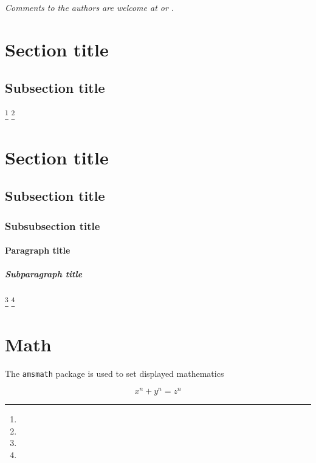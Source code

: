 \documentclass{frbaart}
\begin{document}
%
%

\textit{Comments to the authors are welcome at
  \textup{} or
  \textup{}}.


\mainmatter

\section{Section title}

\lipsum[1][1-3]

\subsection{Subsection title}
\lipsum[1]
\footnote{\lipsum[2] }
\lipsum[1][1]\footnote{\lipsum[3][1]}
\lipsum[1-3]

\section{Section title}

\subsection{Subsection title}

\lipsum[1][1-2]

\subsubsection{Subsubsection title}

\lipsum[2][1-2]

\paragraph{Paragraph title}

\lipsum[3][1-2]

\subparagraph{Subparagraph title}

\lipsum[4][1]\footnote{\lipsum[1] }
\lipsum[5][1]\footnote{\lipsum[6][1] }
\lipsum[1-3]


\section{Math}%
\label{sec:math}

The \texttt{amsmath} package is used to set displayed mathematics

\begin{equation*}
  x^n + y^n = z^n
\end{equation*}
\end{document}
